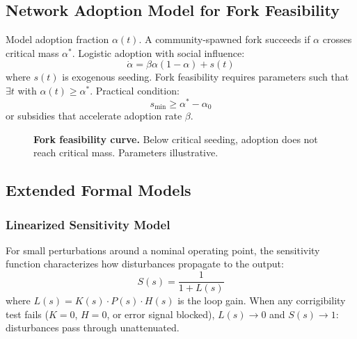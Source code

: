 \documentclass{article}
\begin{document}
\subsection{Network Adoption Model for Fork Feasibility}

Model adoption fraction $\alpha(t)$. A community-spawned fork succeeds if $\alpha$ crosses critical mass $\alpha^*$. Logistic adoption with social influence:
\begin{equation}
\dot{\alpha} = \beta \alpha(1 - \alpha) + s(t)
\end{equation}
where $s(t)$ is exogenous seeding. Fork feasibility requires parameters such that $\exists t$ with $\alpha(t) \geq \alpha^*$. Practical condition:
\begin{equation}
s_{\min} \geq \alpha^* - \alpha_0
\end{equation}
or subsidies that accelerate adoption rate $\beta$.

\begin{figure}[htbp]
\centering
{}
\caption{\textbf{Fork feasibility curve.} Below critical seeding, adoption does not reach critical mass. Parameters illustrative.}
\label{fig:fork-feasibility}
\end{figure}

\subsection{Extended Formal Models}

\subsubsection{Linearized Sensitivity Model}

For small perturbations around a nominal operating point, the sensitivity function characterizes how disturbances propagate to the output:
\begin{equation}
S(s) = \frac{1}{1 + L(s)}
\end{equation}
where $L(s) = K(s) \cdot P(s) \cdot H(s)$ is the loop gain. When any corrigibility test fails ($K=0$, $H=0$, or error signal blocked), $L(s) \to 0$ and $S(s) \to 1$: disturbances pass through unattenuated.
\end{document}
